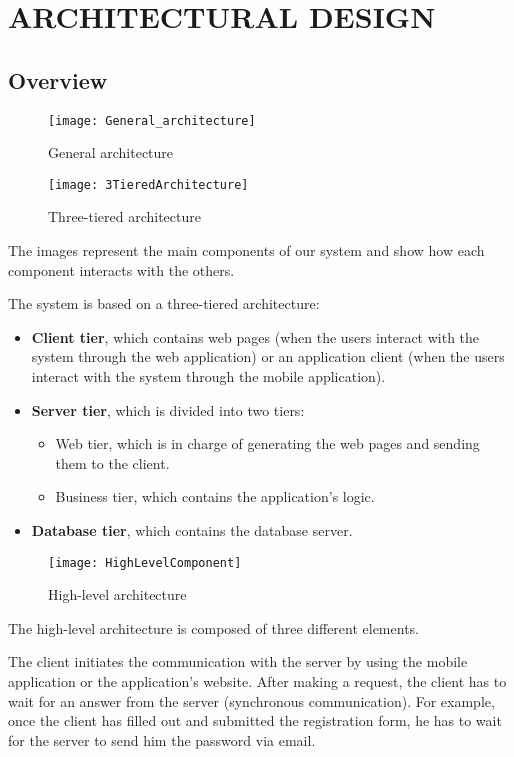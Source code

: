 \section{ARCHITECTURAL DESIGN }
\subsection{Overview}
\begin{figure}[H]
	\centering
	\texttt{[image: General\_architecture]}
	\caption{General architecture}
\end{figure}
\begin{figure}[H]
	\centering
	\texttt{[image: 3TieredArchitecture]}
	\caption{Three-tiered architecture}
\end{figure}
The images represent the main components of our system and show how each component interacts with the others.

The system is based on a three-tiered architecture:
\begin{itemize}
	\item \textbf{Client tier}, which contains web pages (when the users interact with the system through the web application) or an application client (when the users interact with the system through the mobile application).
	\item \textbf{Server tier}, which is divided into two tiers:
	\begin{itemize}
		\item Web tier, which is in charge of generating the web pages and sending them to the client.
		\item Business tier, which contains the application's logic.
	\end{itemize}
	\item \textbf{Database tier}, which contains the database server.
\end{itemize}
\newpage
\begin{figure}[H]
	\centering
	\texttt{[image: HighLevelComponent]}
	\caption{High-level architecture}
\end{figure}
The high-level architecture is composed of three different elements.

The client initiates the communication with the server by using the mobile application or the application's website. After making a request, the client has to wait for an answer from the server (synchronous communication). For example, once the client has filled out and submitted the registration form, he has to wait for the server to send him the password via email. 

